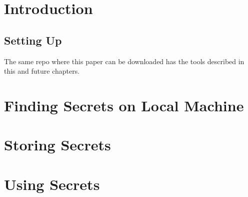 \documentclass[11pt]{report}
\begin{document}
	
	\chapter{Introduction}
	\lipsum[1]
	
	\section{Setting Up}
	
	The same repo where this paper can be downloaded has the tools described in this and future chapters.
	
	\chapter{Finding Secrets on Local Machine}
	
	\lipsum[1]
	
	\chapter{Storing Secrets}
	
	\lipsum[1]
	
	\chapter{Using Secrets}
	
	\lipsum[1]
	
\end{document}

